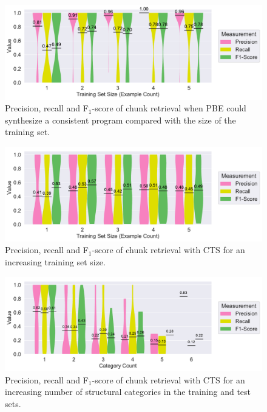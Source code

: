 \documentclass[\myrootdir/main.tex]{subfiles}
\begin{document}
\begin{figure}[t]
		\centering
		\includegraphics[width=\textwidth, clip]{img/big-study/recall-precision-examplecount-sythesisworked-PBE.pdf}
		\caption{Precision, recall and F$_{1}$-score of chunk retrieval when PBE could synthesize a consistent program compared with the size of the training set.}
		\label{fig:recall-precision-examplecount-sythesisworked-PBE}
\end{figure}

\begin{figure}[hp]
		\centering
		\includegraphics[width=\textwidth, clip]{img/big-study/recall-precision-examplecount-CTS.pdf}
		\caption{Precision, recall and F$_{1}$-score of chunk retrieval with CTS for an increasing training set size.}
		\label{fig:recall-precision-examplecount-CTS}
\end{figure}

\begin{figure}[hp]
		\centering
		\includegraphics[width=\textwidth, clip]{img/big-study/recall-precision-categorycount-CTS.pdf}
		\caption{Precision, recall and F$_{1}$-score of chunk retrieval with CTS for an increasing number of structural categories in the training and test sets.}
		\label{fig:recall-precision-categorycount-CTS}
\end{figure}
\end{document}
